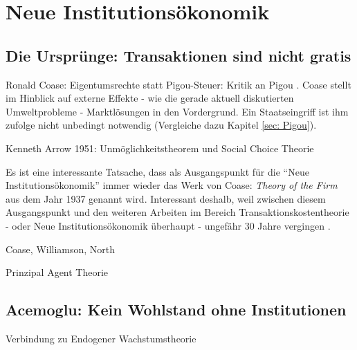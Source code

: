 %
%
%

\chapter{Neue Institutionsökonomik}
\label{Neue Institut}

\section{Die Ursprünge: Transaktionen sind nicht gratis} \label{sec: Neue Inst}

Ronald Coase: Eigentumsrechte statt Pigou-Steuer: Kritik an Pigou \textcite[S. 243]{Cansier1989}. Coase stellt im Hinblick auf externe Effekte - wie die gerade aktuell diskutierten Umweltprobleme - Marktlösungen in den Vordergrund. Ein Staatseingriff ist ihm zufolge nicht unbedingt notwendig (Vergleiche dazu Kapitel \ref{sec: Pigou}).

Kenneth Arrow 1951: Unmöglichkeitstheorem und Social Choice Theorie



Es ist eine interessante Tatsache, dass als Ausgangspunkt für die "`Neue Institutionsökonomik"' immer wieder das Werk von Coase: \textit{Theory of the Firm} aus dem Jahr 1937 genannt wird. Interessant deshalb, weil zwischen diesem Ausgangspunkt und den weiteren Arbeiten im Bereich Transaktionskostentheorie -  oder Neue Institutionsökonomik überhaupt - ungefähr 30 Jahre vergingen \parencite[S. 148]{Blaug2001}.

Coase, Williamson, North

Prinzipal Agent Theorie


\section{Acemoglu: Kein Wohlstand ohne Institutionen}
Verbindung zu Endogener Wachstumstheorie

